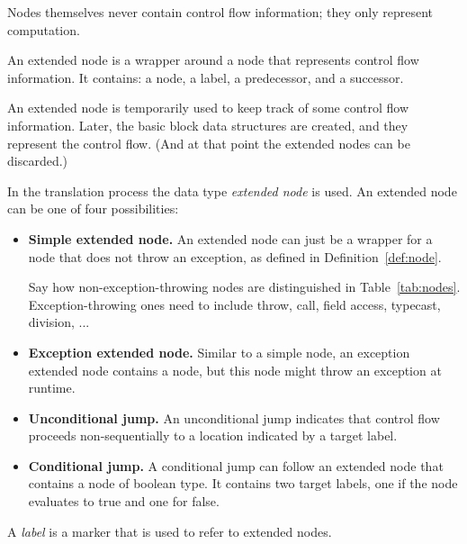 \begin{workinprogress}
Nodes themselves never contain control flow information; they only
represent computation.

An extended node is a wrapper around a node that represents control flow
information.  It contains:  a node, a label, a predecessor, and a
successor.

An extended node is temporarily used to keep track of some control flow
information.  Later, the basic block data structures are created, and they
represent the control flow.  (And at that point the extended nodes can be
discarded.)
\end{workinprogress}

\begin{definition}
    In the translation process the data type \emph{extended node} is used.
    An extended node can be one of four possibilities:
    \begin{itemize}
        \item \textbf{Simple extended node.} An extended node can just be a
          wrapper for a node that does not throw an exception,
        as defined in Definition~\ref{def:node}.
        \begin{workinprogress}
          Say how non-exception-throwing nodes are distinguished in
          Table~\autoref{tab:nodes}.  Exception-throwing ones need to
          include throw, call, field access, typecast, division, ...
        \end{workinprogress}
        \item \textbf{Exception extended node.} Similar to a simple node, an exception extended
        node contains a node, but this node might throw an exception at runtime.
        \item \textbf{Unconditional jump.} An unconditional jump indicates that control
        flow proceeds non-sequentially to a location indicated by a target label.
        \item \textbf{Conditional jump.} A conditional jump can follow an extended node
        that contains a node of boolean type. It contains two target labels, one if the
        node evaluates to true and one for false.
    \end{itemize}
\end{definition}
\begin{definition}[Label]
    A \emph{label} is a marker that is used to refer to extended nodes.
\end{definition}


